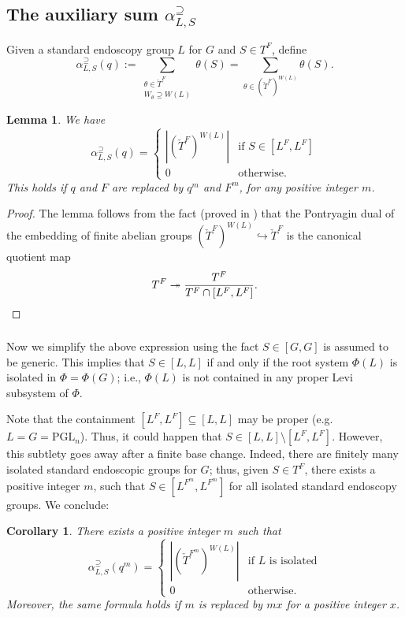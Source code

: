 \documentclass[12pt]{amsart}
\theoremstyle{plain}
\newtheorem{lem}[thm]{Lemma}
\newtheorem{cor}[thm]{Corollary}
\theoremstyle{definition}
\theoremstyle{remark}
\newcommand{\PGL}{\mathrm{PGL}}
\newcommand{\chT}{\check{T}}
\begin{document}
\subsection{The auxiliary sum $\alpha_{L,S}^\supseteq$} \label{ss:Frob}
 Given a standard endoscopy group $L$ for $G$ and $S\in T^F$, define 
\[
\alpha_{L,S}^\supseteq(q):=\sum_{\substack{\theta\in \chT^F \\ W_\theta  \supseteq W(L)}} \theta(S)
=\sum_{\theta \in (\check{T}^F)^{W(L)}} \theta(S).
\]



\begin{lem} We have
\[
\alpha^{\supseteq}_{ L ,S}(q)= 
\begin{cases} |(\chT^F)^{W(L)}| & \textrm{if $S\in [L^F, L^F]$}\\
0 & \textrm{otherwise}. 
\end{cases} 
\]
This holds if $q$ and $F$ are replaced by $q^m$ and $F^m$, for any positive integer $m$.  
\end{lem} 
\begin{proof} The lemma follows from the fact (proved in \cite[\S 5.2]{KNP25}) that the Pontryagin dual of the embedding of finite abelian groups $(\chT^F)^{W(L)} \hookrightarrow \chT^F$ is the canonical quotient map 
\[
T^F \twoheadrightarrow \frac{T^F}{T^F\cap [L^F, L^F]}.\qedhere
\]
\end{proof} 

\subsubsection{} Now we simplify the above expression using the fact $S\in [G,G]$ is assumed to be generic. This implies that $S\in [L,L]$ if  and only if the root system $\Phi(L)$ is isolated in $\Phi=\Phi(G)$; i.e., $\Phi(L)$ is not contained in any proper Levi subsystem of $\Phi$.

 Note that the containment $[L^F, L^F] \subseteq [L,L]$ may be proper (e.g. $L=G=\PGL_n$). Thus, it could happen that $S\in [L,L]\setminus [L^F, L^F]$. However, this subtlety goes away after a finite base change. Indeed, 
 there are finitely many isolated standard endoscopic groups for $G$; thus, given $S\in T^F$, there exists a positive integer $m$, such that  $S\in [L^{F^m}, L^{F^m}]$ for all isolated standard endoscopy groups. We conclude: 

\begin{cor} There exists a positive integer $m$ such that 
\[
\alpha^{\supseteq}_{ L ,S}(q^m)= 
\begin{cases} |(\chT^{F^m})^{W(L)}| & \textrm{if $L$ is isolated}\\
0 & \textrm{otherwise}. 
\end{cases} 
\]
Moreover, the same formula holds if $m$ is replaced by $mx$ for a positive integer $x$. 
\end{cor} 
\end{document}
